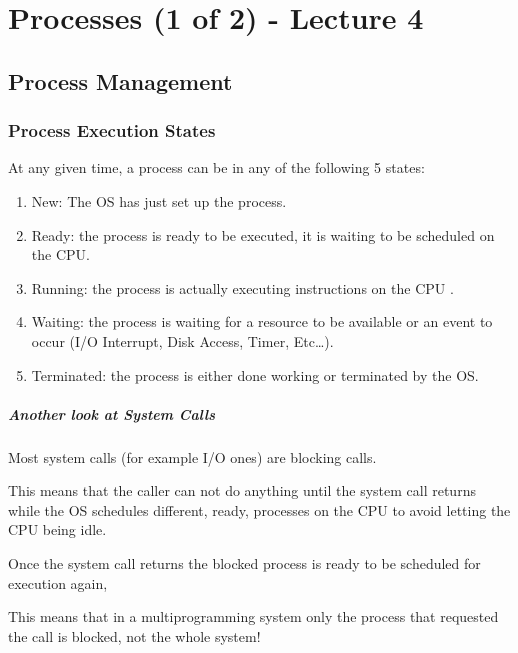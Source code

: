 \documentclass[openright, twoside]{report}
\theoremstyle{definition}
\theoremstyle{example}
\begin{document}
\chapter{Processes (1 of 2) - Lecture 4}
	\section{Process Management}
		\subsection{Process Execution States}
		\label{sec:procStates}
				At any given time, a process can be in any of the following 5 states:
				\begin{enumerate}
					\item New: The OS has just set up the process.
					\item Ready: the process is ready to be executed, it is waiting to be scheduled on the CPU.
					\item Running: the process is actually executing instructions on the CPU .
					\item Waiting: the process is waiting for a resource to be available or an event to occur (I/O Interrupt, Disk Access, Timer, Etc\dots).
					\item Terminated: the process is either done working or terminated by the OS.
				\end{enumerate}

				
				\paragraph{Another look at System Calls} Most system calls (for example I/O ones) 
				are blocking calls. 

				This means that the caller can not do anything until the system call returns 
				while the OS schedules different, ready, processes on the CPU
				to avoid letting the CPU being idle. 
				
				Once the system call returns the blocked process is ready to be scheduled 
				for execution again,

				This means that in a multiprogramming system only the process that 
				requested the call is blocked, not the whole system!
\end{document}
